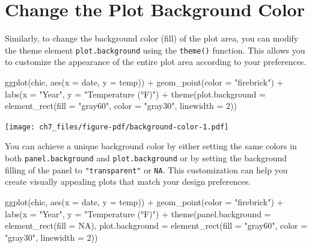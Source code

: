 \documentclass[
  letterpaper,
  DIV=11,
  numbers=noendperiod]{scrreprt}
\newenvironment{Shaded}{\begin{snugshade}}{\end{snugshade}}
\newcommand{\AttributeTok}[1]{\textcolor[rgb]{0.40,0.45,0.13}{#1}}
\newcommand{\ConstantTok}[1]{\textcolor[rgb]{0.56,0.35,0.01}{#1}}
\newcommand{\DecValTok}[1]{\textcolor[rgb]{0.68,0.00,0.00}{#1}}
\newcommand{\FunctionTok}[1]{\textcolor[rgb]{0.28,0.35,0.67}{#1}}
\newcommand{\NormalTok}[1]{\textcolor[rgb]{0.00,0.23,0.31}{#1}}
\newcommand{\SpecialCharTok}[1]{\textcolor[rgb]{0.37,0.37,0.37}{#1}}
\newcommand{\StringTok}[1]{\textcolor[rgb]{0.13,0.47,0.30}{#1}}
\begin{document}
\section{Change the Plot Background
Color}\label{change-the-plot-background-color}

Similarly, to change the background color (fill) of the plot area, you
can modify the theme element \texttt{plot.background} using the
\texttt{theme()} function. This allows you to customize the appearance
of the entire plot area according to your preferences.

\begin{Shaded}
\begin{Highlighting}[]
\FunctionTok{ggplot}\NormalTok{(chic, }\FunctionTok{aes}\NormalTok{(}\AttributeTok{x =}\NormalTok{ date, }\AttributeTok{y =}\NormalTok{ temp)) }\SpecialCharTok{+}
  \FunctionTok{geom\_point}\NormalTok{(}\AttributeTok{color =} \StringTok{"firebrick"}\NormalTok{) }\SpecialCharTok{+}
  \FunctionTok{labs}\NormalTok{(}\AttributeTok{x =} \StringTok{"Year"}\NormalTok{, }\AttributeTok{y =} \StringTok{"Temperature (°F)"}\NormalTok{) }\SpecialCharTok{+}
  \FunctionTok{theme}\NormalTok{(}\AttributeTok{plot.background =} \FunctionTok{element\_rect}\NormalTok{(}\AttributeTok{fill =} \StringTok{"gray60"}\NormalTok{,}
                                       \AttributeTok{color =} \StringTok{"gray30"}\NormalTok{, }\AttributeTok{linewidth =} \DecValTok{2}\NormalTok{))}
\end{Highlighting}
\end{Shaded}

\texttt{[image: ch7\_files/figure-pdf/background-color-1.pdf]}

You can achieve a unique background color by either setting the same
colors in both \texttt{panel.background} and \texttt{plot.background} or
by setting the background filling of the panel to \texttt{"transparent"}
or \texttt{NA}. This customization can help you create visually
appealing plots that match your design preferences.

\begin{Shaded}
\begin{Highlighting}[]
\FunctionTok{ggplot}\NormalTok{(chic, }\FunctionTok{aes}\NormalTok{(}\AttributeTok{x =}\NormalTok{ date, }\AttributeTok{y =}\NormalTok{ temp)) }\SpecialCharTok{+}
  \FunctionTok{geom\_point}\NormalTok{(}\AttributeTok{color =} \StringTok{"firebrick"}\NormalTok{) }\SpecialCharTok{+}
  \FunctionTok{labs}\NormalTok{(}\AttributeTok{x =} \StringTok{"Year"}\NormalTok{, }\AttributeTok{y =} \StringTok{"Temperature (°F)"}\NormalTok{) }\SpecialCharTok{+}
  \FunctionTok{theme}\NormalTok{(}\AttributeTok{panel.background =} \FunctionTok{element\_rect}\NormalTok{(}\AttributeTok{fill =} \ConstantTok{NA}\NormalTok{),}
        \AttributeTok{plot.background =} \FunctionTok{element\_rect}\NormalTok{(}\AttributeTok{fill =} \StringTok{"gray60"}\NormalTok{,}
                                       \AttributeTok{color =} \StringTok{"gray30"}\NormalTok{, }\AttributeTok{linewidth =} \DecValTok{2}\NormalTok{))}
\end{Highlighting}
\end{Shaded}
\end{document}

